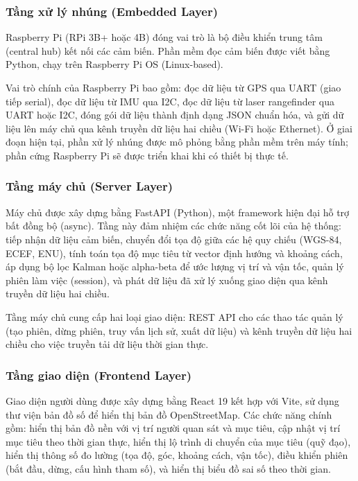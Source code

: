 \subsubsection{Tầng xử lý nhúng (Embedded Layer)}

\hspace{0.5cm} Raspberry Pi (RPi 3B+ hoặc 4B) đóng vai trò là bộ điều khiển trung tâm (central hub) kết nối các cảm biến. Phần mềm đọc cảm biến được viết bằng Python, chạy trên Raspberry Pi OS (Linux-based).

Vai trò chính của Raspberry Pi bao gồm: đọc dữ liệu từ GPS qua UART (giao tiếp serial), đọc dữ liệu từ IMU qua I2C, đọc dữ liệu từ laser rangefinder qua UART hoặc I2C, đóng gói dữ liệu thành định dạng JSON chuẩn hóa, và gửi dữ liệu lên máy chủ qua kênh truyền dữ liệu hai chiều (Wi-Fi hoặc Ethernet). Ở giai đoạn hiện tại, phần xử lý nhúng được mô phỏng bằng phần mềm trên máy tính; phần cứng Raspberry Pi sẽ được triển khai khi có thiết bị thực tế.

\subsubsection{Tầng máy chủ (Server Layer)}

\hspace{0.5cm} Máy chủ được xây dựng bằng FastAPI (Python), một framework hiện đại hỗ trợ bất đồng bộ (async). Tầng này đảm nhiệm các chức năng cốt lõi của hệ thống: tiếp nhận dữ liệu cảm biến, chuyển đổi tọa độ giữa các hệ quy chiếu (WGS-84, ECEF, ENU), tính toán tọa độ mục tiêu từ vector định hướng và khoảng cách, áp dụng bộ lọc Kalman hoặc alpha-beta để ước lượng vị trí và vận tốc, quản lý phiên làm việc (session), và phát dữ liệu đã xử lý xuống giao diện qua kênh truyền dữ liệu hai chiều.

Tầng máy chủ cung cấp hai loại giao diện: REST API cho các thao tác quản lý (tạo phiên, dừng phiên, truy vấn lịch sử, xuất dữ liệu) và kênh truyền dữ liệu hai chiều cho việc truyền tải dữ liệu thời gian thực.

\subsubsection{Tầng giao diện (Frontend Layer)}

\hspace{0.5cm} Giao diện người dùng được xây dựng bằng React 19 kết hợp với Vite, sử dụng thư viện bản đồ số để hiển thị bản đồ OpenStreetMap. Các chức năng chính gồm: hiển thị bản đồ nền với vị trí người quan sát và mục tiêu, cập nhật vị trí mục tiêu theo thời gian thực, hiển thị lộ trình di chuyển của mục tiêu (quỹ đạo), hiển thị thông số đo lường (tọa độ, góc, khoảng cách, vận tốc), điều khiển phiên (bắt đầu, dừng, cấu hình tham số), và hiển thị biểu đồ sai số theo thời gian.

